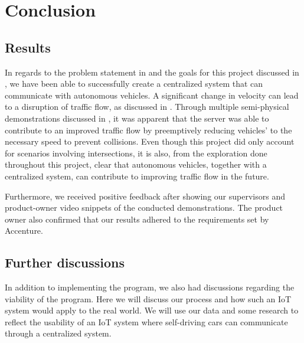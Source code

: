 \chapter{Conclusion}
\section{Results}
In regards to the problem statement in  and the goals for this project discussed in , we have been able to successfully create a centralized system that can communicate with autonomous vehicles. A significant change in velocity can lead to a disruption of traffic flow, as discussed in . Through multiple semi-physical demonstrations discussed in , it was apparent that the server was able to contribute to an improved traffic flow by preemptively reducing vehicles' to the necessary speed to prevent collisions. Even though this project did only account for scenarios involving intersections, it is also, from the exploration done throughout this project, clear that autonomous vehicles, together with a centralized system, can contribute to improving traffic flow in the future.

Furthermore, we received positive feedback after showing our supervisors and product-owner video snippets of the conducted demonstrations. The product owner also confirmed that our results adhered to the requirements set by Accenture.

%


\section{Further discussions}
In addition to implementing the program, we also had discussions regarding the viability of the program. Here we will discuss our process and how such an IoT system would apply to the real world. We will use our data and some research to reflect the usability of an IoT system where self-driving cars can communicate through a centralized system.


